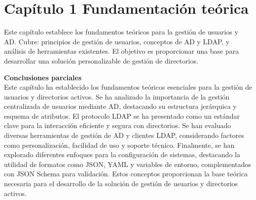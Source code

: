 \section{Capítulo 1 Fundamentación teórica}

Este capítulo establece los fundamentos teóricos para la gestión de usuarios y AD. Cubre: principios de gestión de usuarios, conceptos de AD y LDAP, y análisis de herramientas existentes. El objetivo es proporcionar una base para desarrollar una solución personalizable de gestión de directorios.






\textbf{Conclusiones parciales}\\
Este capítulo ha establecido los fundamentos teóricos esenciales para la gestión de usuarios y directorios activos. Se ha analizado la importancia de la gestión centralizada de usuarios mediante AD, destacando su estructura jerárquica y esquema de atributos. El protocolo LDAP se ha presentado como un estándar clave para la interacción eficiente y segura con directorios. Se han evaluado diversas herramientas de gestión de AD y clientes LDAP, considerando factores como personalización, facilidad de uso y soporte técnico. Finalmente, se han explorado diferentes enfoques para la configuración de sistemas, destacando la utilidad de formatos como JSON, YAML y variables de entorno, complementados con JSON Schema para validación. Estos conceptos proporcionan la base teórica necesaria para el desarrollo de la solución de gestión de usuarios y directorios activos.
